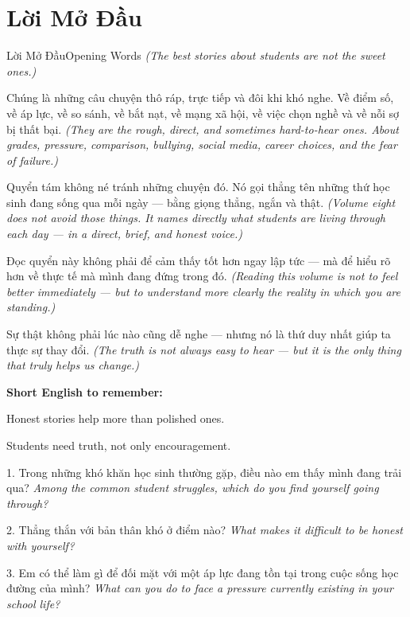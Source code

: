 \chapter*{Lời Mở Đầu}

\begin{truyen}{Lời Mở Đầu}{Opening Words}
\textit{(The best stories about students are not the sweet ones.)}

Chúng là những câu chuyện thô ráp, trực tiếp và đôi khi khó nghe. Về điểm số, về áp lực, về so sánh, về bắt nạt, về mạng xã hội, về việc chọn nghề và về nỗi sợ bị thất bại.
\textit{(They are the rough, direct, and sometimes hard-to-hear ones. About grades, pressure, comparison, bullying, social media, career choices, and the fear of failure.)}

Quyển tám không né tránh những chuyện đó. Nó gọi thẳng tên những thứ học sinh đang sống qua mỗi ngày — bằng giọng thẳng, ngắn và thật.
\textit{(Volume eight does not avoid those things. It names directly what students are living through each day --- in a direct, brief, and honest voice.)}

Đọc quyển này không phải để cảm thấy tốt hơn ngay lập tức — mà để hiểu rõ hơn về thực tế mà mình đang đứng trong đó.
\textit{(Reading this volume is not to feel better immediately --- but to understand more clearly the reality in which you are standing.)}
\end{truyen}

\begin{baihoc}
Sự thật không phải lúc nào cũng dễ nghe --- nhưng nó là thứ duy nhất giúp ta thực sự thay đổi.
\textit{(The truth is not always easy to hear --- but it is the only thing that truly helps us change.)}
\end{baihoc}

\begin{ghinhoanh}
\textbf{Short English to remember:}

Honest stories help more than polished ones.

Students need truth, not only encouragement.
\end{ghinhoanh}

\begin{tuhocnhanh}
1. Trong những khó khăn học sinh thường gặp, điều nào em thấy mình đang trải qua? \textit{Among the common student struggles, which do you find yourself going through?}

2. Thẳng thắn với bản thân khó ở điểm nào? \textit{What makes it difficult to be honest with yourself?}

3. Em có thể làm gì để đối mặt với một áp lực đang tồn tại trong cuộc sống học đường của mình? \textit{What can you do to face a pressure currently existing in your school life?}
\end{tuhocnhanh}

\ngancach
